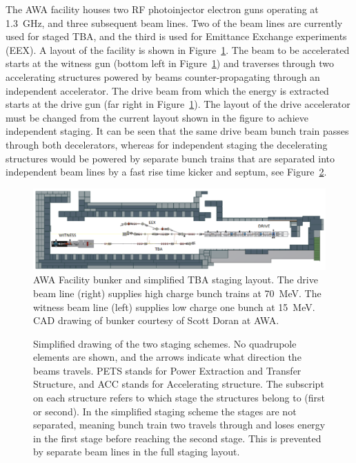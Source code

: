The AWA facility houses two RF photoinjector electron guns operating
at \SI{1.3}{GHz}, and three subsequent beam lines. 
Two of the beam lines are currently used for staged TBA, and the
third is used for Emittance Exchange experiments (EEX). A layout of
the facility is shown in Figure~\ref{fig:bunker}.  
The beam to be accelerated starts at the witness gun (bottom left in Figure~\ref{fig:bunker}) 
and traverses through two accelerating structures powered by beams counter-propagating through 
an independent accelerator. The drive beam from which the energy is extracted starts at the drive gun (far right in Figure~\ref{fig:bunker}).
The layout of the drive accelerator must be changed from the current layout shown in the figure to achieve independent staging.  
It can be seen that the same drive beam bunch train passes through both decelerators, 
whereas for independent staging the decelerating structures would be powered by separate bunch trains
that are separated into independent beam lines by a fast rise time kicker and septum, see Figure~\ref{fig:singlestage}. 
\begin{figure}
	\begin{center}
		\includegraphics[width=\linewidth]{./images/bunker}
	\end{center}
	\caption{AWA Facility bunker and simplified TBA staging layout. 
		The drive beam line (right) supplies high charge bunch trains at \SI{70}{MeV}.
		The witness beam line (left) supplies low charge one bunch at \SI{15}{MeV}. 
		CAD drawing of bunker courtesy of Scott Doran at AWA.}
	\label{fig:bunker}
\end{figure}
\begin{figure}
	\begin{center}
		\begin{tikzpicture}[scale=\textwidth/35cm, text=black]
		
		\end{tikzpicture}
	\end{center}
	\caption{Simplified drawing of the two staging schemes.
		No quadrupole elements are shown, and the arrows indicate what direction the beams travels.
		PETS stands for Power Extraction and Transfer Structure, and ACC stands for Accelerating structure. 
		The subscript on each structure refers to which stage the structures belong to (first or second). 
		In the simplified staging scheme the stages are not separated, meaning bunch train two travels
		through and loses energy in the first stage before reaching the second stage.
		This is prevented by separate beam lines in the full staging layout. }
	\label{fig:singlestage}
\end{figure}

